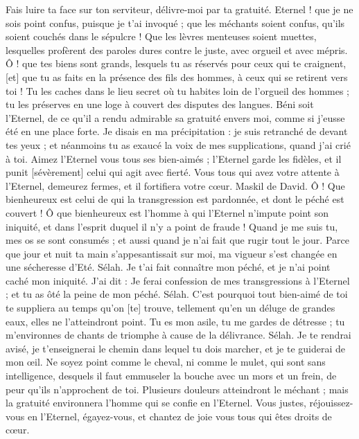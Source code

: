 \begin{multicols}{2}
Fais luire ta face sur ton serviteur, délivre-moi par ta gratuité.
Eternel ! que je ne sois point confus, puisque je t'ai invoqué ; que les méchants soient confus, qu'ils soient couchés dans le sépulcre !
Que les lèvres menteuses soient muettes, lesquelles profèrent des paroles dures contre le juste, avec orgueil et avec mépris.
Ô ! que tes biens sont grands, lesquels tu as réservés pour ceux qui te craignent, [et] que tu as faits en la présence des fils des hommes, à ceux qui se retirent vers toi !
Tu les caches dans le lieu secret où tu habites loin de l'orgueil des hommes ; tu les préserves en une loge à couvert des disputes des langues.
Béni soit l'Eternel, de ce qu'il a rendu admirable sa gratuité envers moi, comme si j'eusse été en une place forte.
Je disais en ma précipitation : je suis retranché de devant tes yeux ; et néanmoins tu as exaucé la voix de mes supplications, quand j'ai crié à toi.
Aimez l'Eternel vous tous ses bien-aimés ; l'Eternel garde les fidèles, et il punit [sévèrement] celui qui agit avec fierté.
Vous tous qui avez votre attente à l'Eternel, demeurez fermes, et il fortifiera votre cœur.
\VerseOne{}Maskil de David. Ô ! Que bienheureux est celui de qui la transgression est pardonnée, et dont le péché est couvert !
Ô que bienheureux est l'homme à qui l'Eternel n'impute point son iniquité, et dans l'esprit duquel il n'y a point de fraude !
Quand je me suis tu, mes os se sont consumés ; et aussi quand je n'ai fait que rugir tout le jour.
Parce que jour et nuit ta main s'appesantissait sur moi, ma vigueur s'est changée en une sécheresse d'Eté. Sélah.
Je t'ai fait connaître mon péché, et je n'ai point caché mon iniquité. J'ai dit : Je ferai confession de mes transgressions à l'Eternel ; et tu as ôté la peine de mon péché. Sélah.
C'est pourquoi tout bien-aimé de toi te suppliera au temps qu'on [te] trouve, tellement qu'en un déluge de grandes eaux, elles ne l'atteindront point.
Tu es mon asile, tu me gardes de détresse ; tu m'environnes de chants de triomphe à cause de la délivrance. Sélah.
Je te rendrai avisé, je t'enseignerai le chemin dans lequel tu dois marcher, et je te guiderai de mon œil.
Ne soyez point comme le cheval, ni comme le mulet, qui sont sans intelligence, desquels il faut emmuseler la bouche avec un mors et un frein, de peur qu'ils n'approchent de toi.
Plusieurs douleurs atteindront le méchant ; mais la gratuité environnera l'homme qui se confie en l'Eternel.
Vous justes, réjouissez-vous en l'Eternel, égayez-vous, et chantez de joie vous tous qui êtes droits de cœur.

\end{multicols}
